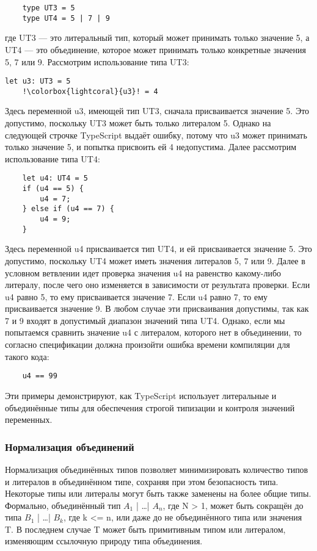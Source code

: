 \begin{lstlisting}
    type UT3 = 5
    type UT4 = 5 | 7 | 9
\end{lstlisting}
где UT3 — это литеральный тип, который может принимать только значение 5, а UT4 — это объединение, которое может
принимать только конкретные значения 5, 7 или 9.
Рассмотрим использование типа UT3:

\begin{lstlisting}[escapechar=!]
    let u3: UT3 = 5
    !\colorbox{lightcoral}{u3}! = 4
\end{lstlisting}
Здесь переменной u3, имеющей тип UT3, сначала присваивается значение 5.
Это допустимо, поскольку UT3 может быть только литералом 5.
Однако на следующей строчке TypeScript выдаёт ошибку, потому что u3 может принимать только значение 5, и попытка
присвоить ей 4 недопустима.
Далее рассмотрим использование типа UT4:
\begin{lstlisting}
    let u4: UT4 = 5
    if (u4 == 5) {
        u4 = 7;
    } else if (u4 == 7) {
        u4 = 9;
    }
\end{lstlisting}
Здесь переменной u4 присваивается тип UT4, и ей присваивается значение 5.
Это допустимо, поскольку UT4 может иметь значения литералов 5, 7 или 9.
Далее в условном ветвлении идет проверка значения u4 на равенство какому-либо литералу, после чего оно изменяется в
зависимости от результата проверки.
Если u4 равно 5, то ему присваивается значение 7.
Если u4 равно 7, то ему присваивается значение 9.
В любом случае эти присваивания допустимы, так как 7 и 9 входят в допустимый диапазон значений типа UT4.
Однако, если мы попытаемся сравнить значение u4 с литералом, которого нет в объединении, то согласно спецификации
должна произойти ошибка времени компиляции для такого кода:
\begin{lstlisting}
    u4 == 99
\end{lstlisting}

Эти примеры демонстрируют, как TypeScript использует литеральные и объединённые типы для обеспечения строгой типизации
и контроля значений переменных.

\subsubsection{Нормализация объединений}

Нормализация объединённых типов позволяет минимизировать количество типов и литералов в объединённом типе, сохраняя
при этом безопасность типа.
Некоторые типы или литералы могут быть также заменены на более общие типы.
Формально, объединённый тип $A_1$ | \ldots | $A_n$, где N > 1, может быть сокращён до типа $B_1$ | \ldots | $B_k$, где k <= n,
или даже до не объединённого типа или значения T\@.
В последнем случае T может быть примитивным типом или литералом, изменяющим ссылочную природу типа объединения.

